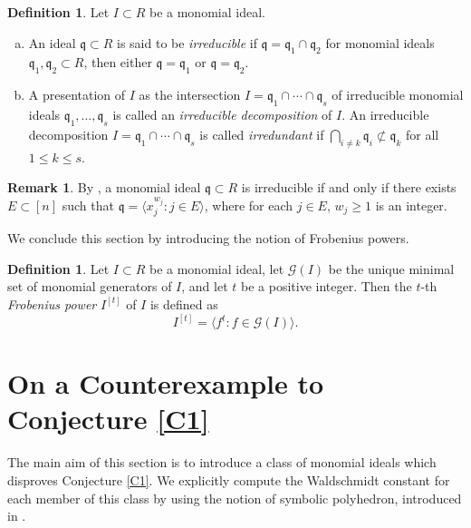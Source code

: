 \documentclass[12pt,reqno]{amsart}
\theoremstyle{definition}
\newtheorem{defn}[thm]{Definition}
\newtheorem{remark}[thm]{Remark}
\newcommand{\q}{\mathfrak{q}}
\numberwithin{equation}{section}
\begin{document}
\begin{defn}
    Let $I \subset R$ be a monomial ideal. 
    \begin{enumerate}[(a)]
        \item An ideal $\q \subset R$ is said to be \textit{irreducible} if $\q = \q_1 \cap \q_2$ for monomial ideals $\q_1, \q_2 \subset R$, then either $\q = \q_1$ or $\q = \q_2.$

        \item A presentation of $I$ as the intersection $I = \q_1 \cap \cdots \cap \q_s$ of irreducible monomial ideals $\q_1, \ldots, \q_s$ is called an \textit{irreducible  decomposition} of $I.$ An irreducible decomposition $I = \q_1 \cap \cdots \cap \q_s$ is called \textit{irredundant} if $\bigcap_{i \ne k} \q_i \not\subset \q_k$ for all $1 \le k \le s.$ 
    \end{enumerate}
\end{defn}

\begin{remark}\label{R-IrreducibleIdeals}
    By \cite[corollary 1.3.2]{HBook}, a monomial ideal $\q \subset R$ is irreducible if and only if there exists $E \subset [n]$ such that $\q = \langle x_{j}^{w_j} : j \in E \rangle$, where for each $j \in E$, $w_j \ge 1$ is an integer.
\end{remark}

We conclude this section by introducing the notion of Frobenius powers.

\begin{defn}
     Let $I \subset R$ be a monomial ideal, let $\mathcal{G}(I)$ be the unique minimal set of monomial generators of $I$, and let $t$ be a positive integer. Then the $t$-th \textit{Frobenius power} $I^{[t]}$ of $I$ is defined as 
     \[I^{[t]} = \langle f^t : f \in \mathcal{G}(I) \rangle.\]
\end{defn}

\section{On a Counterexample to Conjecture \ref{C1}}\label{S-CounterExample}

The main aim of this section is to introduce a class of monomial ideals which disproves Conjecture \ref{C1}. We explicitly compute the Waldschmidt constant for each member of this class by using the notion of symbolic polyhedron, introduced in \cite{CEHH}.
    
\end{document}
